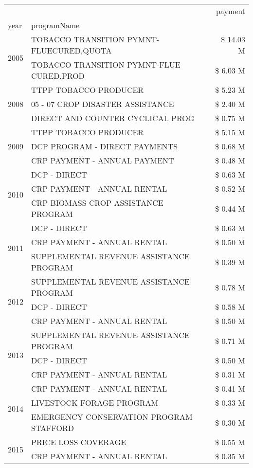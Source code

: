 \begin{tabular}{llr}
\toprule
 &  & payment \\
year & programName &  \\
\midrule
\multirow[t]{2}{*}{2005} & TOBACCO TRANSITION PYMNT-FLUECURED,QUOTA & \$ 14.03 M \\
 & TOBACCO TRANSITION PYMNT-FLUE CURED,PROD & \$ 6.03 M \\
\cline{1-3}
\multirow[t]{3}{*}{2008} & TTPP TOBACCO PRODUCER & \$ 5.23 M \\
 & 05 - 07 CROP DISASTER ASSISTANCE & \$ 2.40 M \\
 & DIRECT AND COUNTER CYCLICAL PROG & \$ 0.75 M \\
\cline{1-3}
\multirow[t]{3}{*}{2009} & TTPP TOBACCO PRODUCER & \$ 5.15 M \\
 & DCP PROGRAM - DIRECT PAYMENTS & \$ 0.68 M \\
 & CRP PAYMENT - ANNUAL PAYMENT & \$ 0.48 M \\
\cline{1-3}
\multirow[t]{3}{*}{2010} & DCP - DIRECT & \$ 0.63 M \\
 & CRP PAYMENT - ANNUAL RENTAL & \$ 0.52 M \\
 & CRP BIOMASS CROP ASSISTANCE PROGRAM & \$ 0.44 M \\
\cline{1-3}
\multirow[t]{3}{*}{2011} & DCP - DIRECT & \$ 0.63 M \\
 & CRP PAYMENT - ANNUAL RENTAL & \$ 0.50 M \\
 & SUPPLEMENTAL REVENUE ASSISTANCE PROGRAM & \$ 0.39 M \\
\cline{1-3}
\multirow[t]{3}{*}{2012} & SUPPLEMENTAL REVENUE ASSISTANCE PROGRAM & \$ 0.78 M \\
 & DCP - DIRECT & \$ 0.58 M \\
 & CRP PAYMENT - ANNUAL RENTAL & \$ 0.50 M \\
\cline{1-3}
\multirow[t]{3}{*}{2013} & SUPPLEMENTAL REVENUE ASSISTANCE PROGRAM & \$ 0.71 M \\
 & DCP - DIRECT & \$ 0.50 M \\
 & CRP PAYMENT - ANNUAL RENTAL & \$ 0.31 M \\
\cline{1-3}
\multirow[t]{3}{*}{2014} & CRP PAYMENT - ANNUAL RENTAL & \$ 0.41 M \\
 & LIVESTOCK FORAGE PROGRAM & \$ 0.33 M \\
 & EMERGENCY CONSERVATION PROGRAM STAFFORD & \$ 0.30 M \\
\cline{1-3}
\multirow[t]{3}{*}{2015} & PRICE LOSS COVERAGE & \$ 0.55 M \\
 & CRP PAYMENT - ANNUAL RENTAL & \$ 0.35 M \\

\end{tabular}
